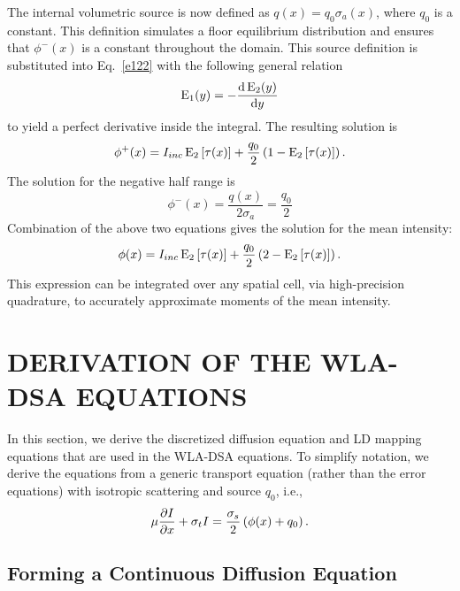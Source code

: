The internal volumetric source is now defined as $q(x) = q_0 \sigma_a(x)$, where $q_0$ is
a constant.  This
definition simulates a floor equilibrium distribution and ensures that $\phi^-(x)$ is a
constant throughout the domain.  This source definition is substituted into
Eq.~\eqref{e122} with the following general relation~\cite{abramowitz}
\begin{equation}
    \operatorname{E}_{1}(y) = -\frac{\mathrm{d}\operatorname{E}_{2}(y)}{\mathrm{d} y}  
\end{equation}
to yield a perfect derivative inside the integral. The resulting solution is
\begin{equation}
    \phi^+(x) = I_{inc}\operatorname{E}_{2}\left[\tau(x)\right] + \frac{q_0}{2} \left(1 -
    \operatorname{E}_{2}\left[\tau(x) \right]\right).
\end{equation}
The solution for the negative half range is
\begin{equation}
    \phi^{-}(x) = \frac{q(x)}{2\sigma_a} = \frac{q_0}{2}
\end{equation}
Combination of the above two equations gives the solution for the mean intensity:
\begin{equation}
    \phi(x) = I_{inc}\operatorname{E}_{2}\left[\tau(x)\right] + \frac{q_0}{2} \left(2 -
    \operatorname{E}_{2}\left[\tau(x)\right]\right) .
\end{equation}
This expression can be integrated over any spatial cell, via high-precision quadrature, to accurately approximate moments of
the mean intensity.


\chapter{\uppercase{Derivation of the WLA-DSA Equations}}
\label{sec:wla_derivation}

In this section, we derive the discretized diffusion equation and LD mapping equations
that are used in the WLA-DSA equations.  To simplify notation, we
derive the equations from a generic transport equation (rather than the error equations) with isotropic scattering
and source $q_0$, i.e.,
\begin{equation}\label{eq:ss_trans}
    \mu \frac{\partial I}{\partial x} + \sigma_t I = \frac{\sigma_s}{2}\left( \phi(x) + q_0\right).
\end{equation}

\section{Forming a Continuous Diffusion Equation}

